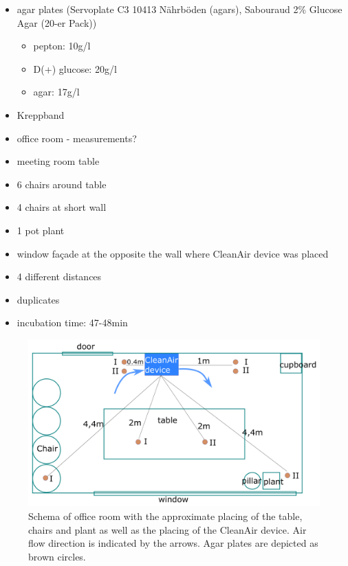 \documentclass[hyperref]{labbook}
\begin{document}
\begin{itemize}
\item agar plates (Servoplate C3 10413 Nährböden (agars), Sabouraud 2\% Glucose Agar (20-er Pack))
\begin{itemize}
\item pepton: 10g/l
\item D(+) glucose: 20g/l
\item agar: 17g/l
\end{itemize}
\item Kreppband
\end{itemize}
\begin{itemize}
\item office room - measurements?
\item meeting room table 
\item 6 chairs around table
\item 4 chairs at short wall
\item 1 pot plant
\item window façade at the opposite the wall where CleanAir device was placed
\end{itemize}
\begin{itemize}
\item 4 different distances
\item duplicates
\item incubation time: 47-48min
\end{itemize}
\begin{figure}[h]
\includegraphics[scale=0.28]{cleanair_experiment_schema}
\caption{Schema of office room with the approximate placing of the table, chairs and plant as well as the placing of the CleanAir device. Air flow direction is indicated by the arrows. Agar plates are depicted as brown circles.}
\end{figure}
\end{document}
